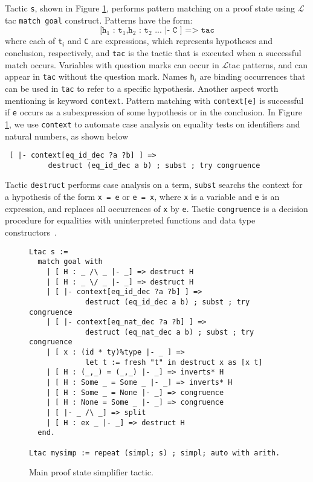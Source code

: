 Tactic \texttt{s}, shown in Figure \ref{simptac}, performs pattern
matching on a proof state using $\mathcal{L}$tac \texttt{match goal}
construct. Patterns have the form:
\[ \texttt{[h$_1$ : t$_1$,h$_2$ : t$_2$ ... |- C ] => tac}\] 
where each of \texttt{t}$_i$ and \texttt{C} are expressions, which
represents hypotheses and conclusion, respectively, and \texttt{tac}
is the tactic that is executed when a successful match
occurs. Variables with question marks can occur in $\mathcal{L}$tac
patterns, and can appear in \texttt{tac} without the question
mark. Names \texttt{h}$_i$ are binding occurrences that can be used in
\texttt{tac} to refer to a specific hypothesis. Another aspect
worth mentioning is keyword \texttt{context}. Pattern matching with
\texttt{context[e]} is successful if \texttt{e} occurs as a
subexpression of some hypothesis or in the conclusion. In Figure
\ref{simptac}, we use \texttt{context} to automate case analysis on
equality tests on identifiers and natural numbers, as shown below
\begin{lstlisting}
 [ |- context[eq_id_dec ?a ?b] ] => 
          destruct (eq_id_dec a b) ; subst ; try congruence
\end{lstlisting}
Tactic \texttt{destruct} performs case analysis on a term,
\texttt{subst} searchs the context for a hypothesis of the form
\texttt{x = e} or \texttt{e = x}, where \texttt{x} is a variable and
\texttt{e} is an expression, and replaces all occurrences of
\texttt{x} by \texttt{e}.
Tactic \texttt{congruence} is a decision
procedure for equalities with uninterpreted functions and data type
constructors~\cite{Bertot04}.
\begin{figure}[H]
\begin{lstlisting}
Ltac s :=
  match goal with
    | [ H : _ /\ _ |- _] => destruct H
    | [ H : _ \/ _ |- _] => destruct H
    | [ |- context[eq_id_dec ?a ?b] ] => 
             destruct (eq_id_dec a b) ; subst ; try congruence
    | [ |- context[eq_nat_dec ?a ?b] ] => 
             destruct (eq_nat_dec a b) ; subst ; try congruence
    | [ x : (id * ty)%type |- _ ] => 
             let t := fresh "t" in destruct x as [x t]
    | [ H : (_,_) = (_,_) |- _] => inverts* H
    | [ H : Some _ = Some _ |- _] => inverts* H
    | [ H : Some _ = None |- _] => congruence
    | [ H : None = Some _ |- _] => congruence
    | [ |- _ /\ _] => split
    | [ H : ex _ |- _] => destruct H
  end.

Ltac mysimp := repeat (simpl; s) ; simpl; auto with arith.
\end{lstlisting}
\caption{Main proof state simplifier tactic.}
\label{simptac}
\end{figure}

